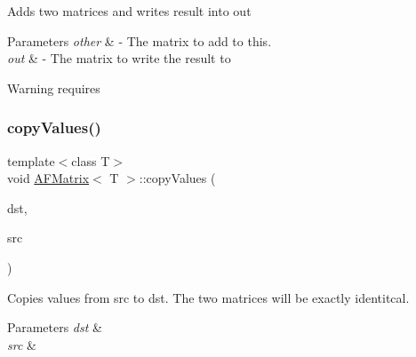 Adds two matrices and writes result into {\ttfamily out} 
\begin{DoxyParams}{Parameters}
{\em other} & -\/ The matrix to add to {\ttfamily this}. \\
\hline
{\em out} & -\/ The matrix to write the result to \\
\hline
\end{DoxyParams}
\begin{DoxyWarning}{Warning}
requires 
\end{DoxyWarning}
\mbox{\label{classAFMatrix_a3af0a59b91c2d8f7104f2f8ef15743f2}} 
\subsubsection{\texorpdfstring{copy\+Values()}{copyValues()}\hspace{0.1cm}{\footnotesize\ttfamily [1/4]}}
{\footnotesize\ttfamily template$<$class T$>$ \\
void \hyperlink{classAFMatrix}{A\+F\+Matrix}$<$ T $>$\+::copy\+Values (\begin{DoxyParamCaption}\item[{\hyperlink{classAFMatrix}{A\+F\+Matrix}$<$ T $>$ $\ast$}]{dst,  }\item[{\hyperlink{classAFMatrix}{A\+F\+Matrix}$<$ T $>$ $\ast$}]{src }\end{DoxyParamCaption})\hspace{0.3cm}{\ttfamily [inline]}}

Copies values from {\ttfamily src} to {\ttfamily dst}. The two matrices will be exactly identitcal. 
\begin{DoxyParams}{Parameters}
{\em dst} & \\
\hline
{\em src} & \\
\hline
\end{DoxyParams}
\mbox{\label{classAFMatrix_a6d292f066e738be27e299d0a619faa07}} 
